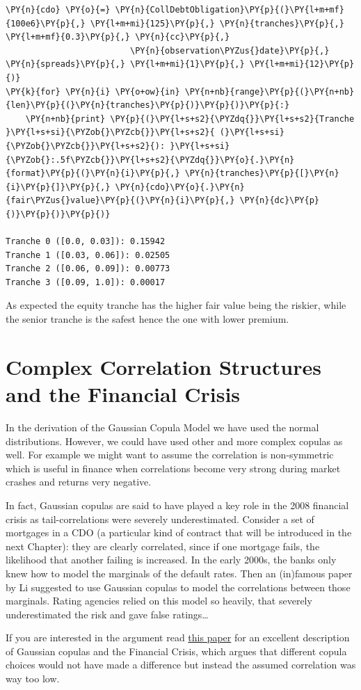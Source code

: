 \begin{tcolorbox}[breakable, size=fbox, boxrule=1pt, pad at break*=1mm,colback=cellbackground, colframe=cellborder]
\begin{Verbatim}[commandchars=\\\{\}]
\PY{n}{cdo} \PY{o}{=} \PY{n}{CollDebtObligation}\PY{p}{(}\PY{l+m+mf}{100e6}\PY{p}{,} \PY{l+m+mi}{125}\PY{p}{,} \PY{n}{tranches}\PY{p}{,} \PY{l+m+mf}{0.3}\PY{p}{,} \PY{n}{cc}\PY{p}{,}
                         \PY{n}{observation\PYZus{}date}\PY{p}{,} \PY{n}{spreads}\PY{p}{,} \PY{l+m+mi}{1}\PY{p}{,} \PY{l+m+mi}{12}\PY{p}{)}
\PY{k}{for} \PY{n}{i} \PY{o+ow}{in} \PY{n+nb}{range}\PY{p}{(}\PY{n+nb}{len}\PY{p}{(}\PY{n}{tranches}\PY{p}{)}\PY{p}{)}\PY{p}{:}
    \PY{n+nb}{print} \PY{p}{(}\PY{l+s+s2}{\PYZdq{}}\PY{l+s+s2}{Tranche }\PY{l+s+si}{\PYZob{}\PYZcb{}}\PY{l+s+s2}{ (}\PY{l+s+si}{\PYZob{}\PYZcb{}}\PY{l+s+s2}{): }\PY{l+s+si}{\PYZob{}:.5f\PYZcb{}}\PY{l+s+s2}{\PYZdq{}}\PY{o}{.}\PY{n}{format}\PY{p}{(}\PY{n}{i}\PY{p}{,} \PY{n}{tranches}\PY{p}{[}\PY{n}{i}\PY{p}{]}\PY{p}{,} \PY{n}{cdo}\PY{o}{.}\PY{n}{fair\PYZus{}value}\PY{p}{(}\PY{n}{i}\PY{p}{,} \PY{n}{dc}\PY{p}{)}\PY{p}{)}\PY{p}{)}

Tranche 0 ([0.0, 0.03]): 0.15942
Tranche 1 ([0.03, 0.06]): 0.02505
Tranche 2 ([0.06, 0.09]): 0.00773
Tranche 3 ([0.09, 1.0]): 0.00017
\end{Verbatim}
\end{tcolorbox}

As expected the equity tranche has the higher fair value being the riskier, while the senior tranche is the safest hence the one with lower premium.

\section{Complex Correlation Structures and the Financial
	Crisis}\label{complex-correlation-structures-and-the-financial-crisis}

In the derivation of the Gaussian Copula Model we have used the normal distributions. However, we could have used other and more complex
copulas as well. For example we might want to assume the correlation is
non-symmetric which is useful in finance when correlations become
very strong during market crashes and returns very negative.

In fact, Gaussian copulas are said to have played a key role in the 2008
financial crisis as tail-correlations were severely underestimated.
Consider a set of mortgages in a CDO (a particular kind of contract that will be introduced in the next Chapter): they are clearly correlated, since if one mortgage fails,
the likelihood that another failing is increased. In the early 2000s,
the banks only knew how to model the marginals of the default rates. Then an
(in)famous paper by Li suggested to use Gaussian copulas to model the
correlations between those marginals. Rating agencies relied on this model so heavily, that severely underestimated the risk and gave false ratings\ldots

If you are interested in the argument read
\href{http://samueldwatts.com/wp-content/uploads/2016/08/Watts-Gaussian-Copula_Financial_Crisis.pdf}{this paper}
for an excellent description of Gaussian copulas and the Financial
Crisis, which argues that different copula choices would not have made a
difference but instead the assumed correlation was way too low.
